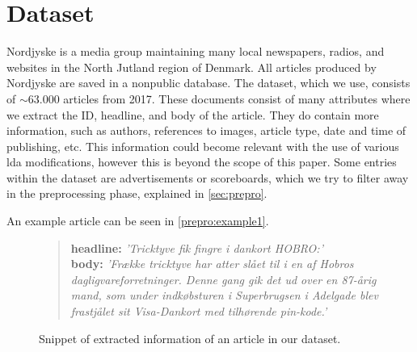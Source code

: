 \section{Dataset}\label{sec:dataset}
Nordjyske is a media group maintaining many local newspapers, radios, and websites in the North Jutland region of Denmark.
All articles produced by Nordjyske are saved in a nonpublic database.
The dataset, which we use, consists of $\sim\! 63.000$ articles from 2017.
These documents consist of many attributes where we extract the ID, headline, and body of the article.
They do contain more information, such as authors, references to images, article type, date and time of publishing, etc.
This information could become relevant with the use of various \gls{lda} modifications, however this is beyond the scope of this paper.
Some entries within the dataset are advertisements or scoreboards, which we try to filter away in the preprocessing phase, explained in \autoref{sec:prepro}.

An example article can be seen in \autoref{prepro:example1}.

\begin{figure}[h]
	\begin{framed}
		\begin{quote}
			\textbf{headline:} \textit{'Tricktyve fik fingre i dankort HOBRO:'}\\
			\textbf{body:} \textit{'Frække tricktyve har atter slået til i en af Hobros dagligvareforretninger. Denne gang gik det ud over en 87-årig mand, som under indkøbsturen i Superbrugsen i Adelgade blev frastjålet sit Visa-Dankort med tilhørende pin-kode.'}
		\end{quote}
	\end{framed}
		\caption{Snippet of extracted information of an article in our dataset.}
		\label{prepro:example1}
\end{figure}
